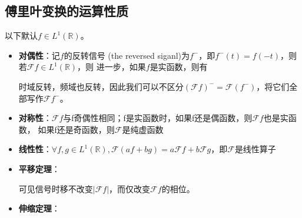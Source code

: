 \subsection{傅里叶变换的运算性质}\label{sub:fourier_operation_properties}
\begin{theorem}[傅里叶变换的运算性质]
    以下默认$f\in L^1(\mathbb{R})$。
    \begin{itemize}   
    \item \textbf{对偶性}：记$f$的反转信号 (the reversed siganl)为$f^-$，即$f^-(t)=f(-t)$，则
        若$\mathcal{F} f\in L^1(\mathbb{R})$，则
        进一步，如果$f$是实函数，则有
          \begin{remark}
            时域反转，频域也反转，因此我们可以不区分$(\mathcal{F}f)^-=\mathcal{F} (f^-)$，将它们全部写作$\mathcal{F} f^-$。
          \end{remark}
    \item \textbf{对称性}：$\mathcal{F} f$与f奇偶性相同；f是实函数时，如果f还是偶函数，则$\mathcal{F} f$也是实函数，
          如果f还是奇函数，则$\mathcal{F} $是纯虚函数
    \item \textbf{线性性}：$\forall f,g\in L^1(\mathbb{R}),\mathcal{F} (af+bg)=a\mathcal{F} f+b\mathcal{F} g$，即$\mathcal{F} $是线性算子
    \item \textbf{平移定理}：
          \begin{remark}
          可见信号时移不改变$|\mathcal{F} f|$，而仅改变$\mathcal{F} f$的相位。
          \end{remark}
    \item \textbf{伸缩定理}：
\end{itemize}
\end{theorem}
